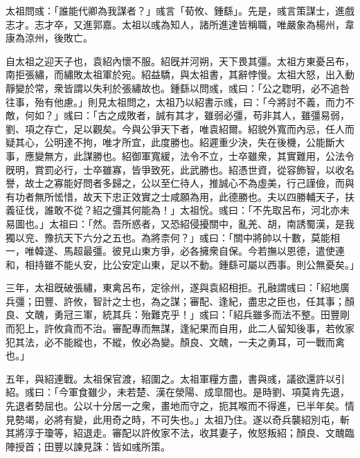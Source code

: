 \begin{pinyinscope}
 太祖問彧：「誰能代卿為我謀者？」彧言「荀攸、鍾繇」。先是，彧言策謀士，進戲志才。志才卒，又進郭嘉。太祖以彧為知人，諸所進達皆稱職，唯嚴象為楊州，韋康為涼州，後敗亡。
 
 
 
 
 自太祖之迎天子也，袁紹內懷不服。紹旣并河朔，天下畏其彊。太祖方東憂呂布，南拒張繡，而繡敗太祖軍於宛。紹益驕，與太祖書，其辭悖慢。太祖大怒，出入動靜變於常，衆皆謂以失利於張繡故也。鍾繇以問彧，彧曰：「公之聦明，必不追咎往事，殆有他慮。」則見太祖問之，太祖乃以紹書示彧，曰：「今將討不義，而力不敵，何如？」彧曰：「古之成敗者，誠有其才，雖弱必彊，苟非其人，雖彊易弱，劉、項之存亡，足以觀矣。今與公爭天下者，唯袁紹爾。紹貌外寬而內忌，任人而疑其心，公明達不拘，唯才所宜，此度勝也。紹遲重少決，失在後機，公能斷大事，應變無方，此謀勝也。紹御軍寬緩，法令不立，士卒雖衆，其實難用，公法令旣明，賞罰必行，士卒雖寡，皆爭致死，此武勝也。紹憑世資，從容飾智，以收名譽，故士之寡能好問者多歸之，公以至仁待人，推誠心不為虛美，行己謹儉，而與有功者無所恡惜，故天下忠正效實之士咸願為用，此德勝也。夫以四勝輔天子，扶義征伐，誰敢不從？紹之彊其何能為！」太祖恱。彧曰：「不先取呂布，河北亦未易圖也。」太祖曰：「然。吾所惑者，又恐紹侵擾關中，亂羌、胡，南誘蜀漢，是我獨以兖、豫抗天下六分之五也。為將柰何？」彧曰：「關中將帥以十數，莫能相一，唯韓遂、馬超最彊。彼見山東方爭，必各擁衆自保。今若撫以恩德，遣使連和，相持雖不能乆安，比公安定山東，足以不動。鍾繇可屬以西事。則公無憂矣。」
 
 
 
 
 三年，太祖旣破張繡，東禽呂布，定徐州，遂與袁紹相拒。孔融謂彧曰：「紹地廣兵彊；田豐、許攸，智計之士也，為之謀；審配、逢紀，盡忠之臣也，任其事；顏良、文醜，勇冠三軍，統其兵：殆難克乎！」彧曰：「紹兵雖多而法不整。田豐剛而犯上，許攸貪而不治。審配專而無謀，逢紀果而自用，此二人留知後事，若攸家犯其法，必不能縱也，不縱，攸必為變。顏良、文醜，一夫之勇耳，可一戰而禽也。」
 
 
 
 
 五年，與紹連戰。太祖保官渡，紹圍之。太祖軍糧方盡，書與彧，議欲還許以引紹。彧曰：「今軍食雖少，未若楚、漢在滎陽、成皐間也。是時劉、項莫肯先退，先退者勢屈也。公以十分居一之衆，畫地而守之，扼其喉而不得進，已半年矣。情見勢竭，必將有變，此用奇之時，不可失也。」太祖乃住。遂以奇兵襲紹別屯，斬其將淳于瓊等，紹退走。審配以許攸家不法，收其妻子，攸怒叛紹；顏良、文醜臨陣授首；田豐以諫見誅：皆如彧所策。
 

\end{pinyinscope}
